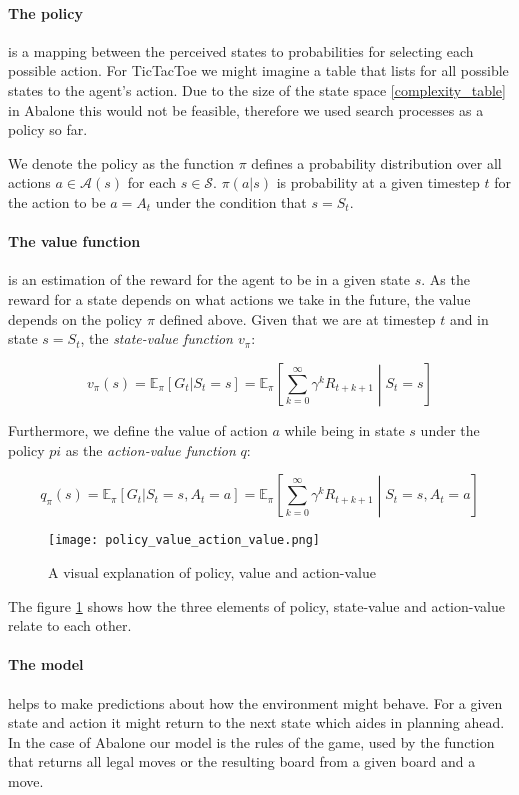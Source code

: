 \paragraph{The policy} is a mapping between the perceived states to probabilities for selecting each possible action. For TicTacToe we might imagine a table that lists for all possible states to the agent's action. Due to the size of the state  space \ref{complexity_table} in Abalone this would not be feasible, therefore we used search processes as a policy so far.

We denote the policy as the function $\pi $ defines a probability distribution over all actions $ a \in \mathcal{A}(s)$ for each $ s \in \mathcal{S} $. $ \pi(a|s)$ is probability at a given timestep $t$ for the action to be $ a = A_t $ under the condition that $ s = S_t $.

\paragraph{The value function} is an estimation of the reward for the agent to be in a given state $ s $.  As the reward for a state depends on what actions we take in the future, the value depends on the policy $ \pi $ defined above. Given that we are at timestep $ t $ and in state $ s = S_t $, the \textit{state-value function $v_{\pi}$}:

$$ v_{\pi}(s) = \mathbb{E}_{\pi}[G_t | S_t = s] = \mathbb{E}_{\pi}\left[\sum_{k=0}^{\infty} \gamma^kR_{t+k+1} \middle| S_t = s \right] $$

Furthermore, we define the value of action $a$ while being in state $s$ under the policy $pi$ as the \textit{action-value function} $q$:

$$ q_{\pi}(s) = \mathbb{E}_{\pi}[G_t | S_t = s, A_t = a] = \mathbb{E}_{\pi}\left[\sum_{k=0}^{\infty} \gamma^kR_{t+k+1} \middle| S_t = s, A_t = a \right] $$

\begin{figure}
    \centering
    \texttt{[image: policy\_value\_action\_value.png]}
    \caption{A visual explanation of policy, value and action-value \cite[p.62]{sutton_reinforcement_2018}}
    \label{policy_value_action_value}
\end{figure}

The figure \ref{policy_value_action_value} shows how the three elements of policy, state-value and action-value relate to each other.

\paragraph{The model} helps to make predictions about how the environment might behave. For a given state and action it might return to the next state which aides in planning ahead. In the case of Abalone our model is the rules of the game, used by the function that returns all legal moves or the resulting board from a given board and a move.

